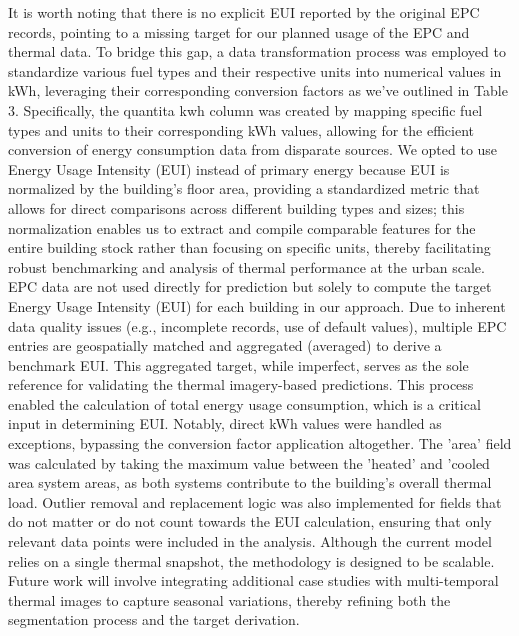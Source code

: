 \documentclass[preprint,12pt]{elsarticle}
\begin{document}
        It is worth noting that there is no explicit EUI reported by the original EPC records, pointing to a missing target for our planned usage of the EPC and thermal data. To bridge this gap, a data transformation process was employed to standardize various fuel types and their respective units into numerical values in kWh, leveraging their corresponding conversion factors as we've outlined in Table 3.  Specifically, the quantita kwh column was created by mapping specific fuel types and units to their corresponding kWh values, allowing for the efficient conversion of energy consumption data from disparate sources.  We opted to use Energy Usage Intensity (EUI) instead of primary energy because EUI is normalized by the building's floor area, providing a standardized metric that allows for direct comparisons across different building types and sizes; this normalization enables us to extract and compile comparable features for the entire building stock rather than focusing on specific units, thereby facilitating robust benchmarking and analysis of thermal performance at the urban scale.  EPC data are not used directly for prediction but solely to compute the target Energy Usage Intensity (EUI) for each building in our approach.  Due to inherent data quality issues (e.g., incomplete records, use of default values), multiple EPC entries are geospatially matched and aggregated (averaged) to derive a benchmark EUI.  This aggregated target, while imperfect, serves as the sole reference for validating the thermal imagery-based predictions.  This process enabled the calculation of total energy usage consumption, which is a critical input in determining EUI.  Notably, direct kWh values were handled as exceptions, bypassing the conversion factor application altogether.  The 'area' field was calculated by taking the maximum value between the 'heated' and 'cooled area system areas, as both systems contribute to the building's overall thermal load.  Outlier removal and replacement logic was also implemented for fields that do not matter or do not count towards the EUI calculation, ensuring that only relevant data points were included in the analysis.  Although the current model relies on a single thermal snapshot, the methodology is designed to be scalable.  Future work will involve integrating additional case studies with multi-temporal thermal images to capture seasonal variations, thereby refining both the segmentation process and the target derivation.
                
\end{document}
